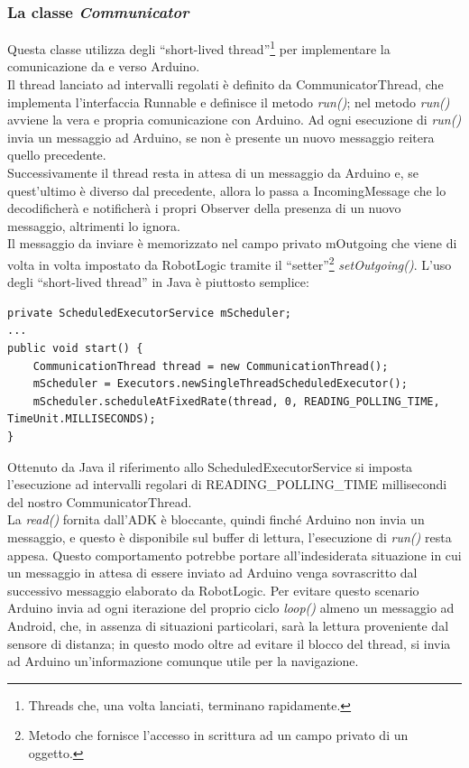 \subsubsection{La classe \emph{Communicator}}
Questa classe utilizza degli ``short-lived thread''\footnote{Threads che, una volta 
lanciati, terminano rapidamente.} per implementare la comunicazione da e verso Arduino.\\
Il thread lanciato ad intervalli regolati è definito da CommunicatorThread, che implementa l'interfaccia 
Runnable e definisce il metodo \emph{run()}; nel metodo \emph{run()} avviene
la vera e propria comunicazione con Arduino. Ad ogni esecuzione di \emph{run()} 
invia un messaggio ad Arduino, se non è presente un nuovo messaggio reitera quello precedente.\\
Successivamente il thread resta in attesa di un messaggio da Arduino e, se quest'ultimo è diverso 
dal precedente, allora lo passa a IncomingMessage che lo decodificherà
e notificherà i propri Observer della presenza di un nuovo messaggio, altrimenti lo ignora.\\
Il messaggio da inviare è memorizzato nel campo privato mOutgoing che viene di volta 
in volta impostato da RobotLogic tramite il ``setter''\footnote{Metodo che fornisce 
l'accesso in scrittura ad un campo privato di un oggetto.} \emph{setOutgoing()}.
L'uso degli ``short-lived thread'' in Java è piuttosto semplice:
\begin{lstlisting}[caption=Metodo di inizializzazione degli short-lived thread in Communicator] 
private ScheduledExecutorService mScheduler;
...
public void start() {
    CommunicationThread thread = new CommunicationThread();
    mScheduler = Executors.newSingleThreadScheduledExecutor();
    mScheduler.scheduleAtFixedRate(thread, 0, READING_POLLING_TIME, TimeUnit.MILLISECONDS);
}
\end{lstlisting}
Ottenuto da Java il riferimento allo ScheduledExecutorService si imposta l'esecuzione ad 
intervalli regolari di READING\_POLLING\_TIME millisecondi del nostro CommunicatorThread.\\ 
La \emph{read()} fornita dall'ADK è bloccante, quindi finché Arduino
non invia un messaggio, e questo è disponibile sul buffer di lettura, l'esecuzione di 
\emph{run()} resta appesa. Questo comportamento potrebbe portare 
all'indesiderata situazione in cui un messaggio in attesa di essere inviato ad Arduino
venga sovrascritto dal successivo messaggio elaborato da RobotLogic. Per evitare questo scenario
Arduino invia ad ogni iterazione del proprio ciclo \emph{loop()} almeno un messaggio ad
Android, che, in assenza di situazioni particolari, sarà la lettura proveniente dal 
sensore di distanza; in questo modo oltre ad evitare il blocco del thread,
si invia ad Arduino un'informazione comunque utile per la navigazione.


